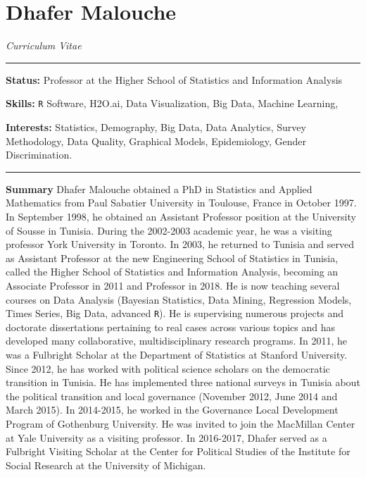 \documentclass[]{article}
\title{}
\author{}
\date{}
\begin{document}
\section{Dhafer Malouche}\label{dhafer-malouche}

\emph{Curriculum Vitae}

\begin{center}\rule{0.5\linewidth}{\linethickness}\end{center}

\textbf{Status:} Professor at the Higher School of Statistics and
Information Analysis

\textbf{Skills:} \texttt{R} Software, H2O.ai, Data Visualization, Big
Data, Machine Learning,

\textbf{Interests:} Statistics, Demography, Big Data, Data Analytics,
Survey Methodology, Data Quality, Graphical Models, Epidemiology, Gender
Discrimination.

\begin{center}\rule{0.5\linewidth}{\linethickness}\end{center}

\textbf{Summary} Dhafer Malouche obtained a PhD in Statistics and
Applied Mathematics from Paul Sabatier University in Toulouse, France in
October 1997. In September 1998, he obtained an Assistant Professor
position at the University of Sousse in Tunisia. During the 2002-2003
academic year, he was a visiting professor York University in Toronto.
In 2003, he returned to Tunisia and served as Assistant Professor at the
new Engineering School of Statistics in Tunisia, called the Higher
School of Statistics and Information Analysis, becoming an Associate
Professor in 2011 and Professor in 2018. He is now teaching several
courses on Data Analysis (Bayesian Statistics, Data Mining, Regression
Models, Times Series, Big Data, advanced \texttt{R}). He is supervising
numerous projects and doctorate dissertations pertaining to real cases
across various topics and has developed many collaborative,
multidisciplinary research programs. In 2011, he was a Fulbright Scholar
at the Department of Statistics at Stanford University. Since 2012, he
has worked with political science scholars on the democratic transition
in Tunisia. He has implemented three national surveys in Tunisia about
the political transition and local governance (November 2012, June 2014
and March 2015). In 2014-2015, he worked in the Governance Local
Development Program of Gothenburg University. He was invited to join the
MacMillan Center at Yale University as a visiting professor. In
2016-2017, Dhafer served as a Fulbright Visiting Scholar at the Center
for Political Studies of the Institute for Social Research at the
University of Michigan.
\end{document}
